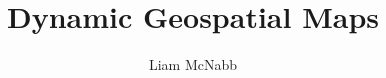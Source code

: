\documentclass[nobindpdf,a4paper,oneside]{hepthesis}
\title{Dynamic Geospatial Maps}
\author{Liam McNabb}
\begin{document}
\small
\begin{frontmatter}
  
\end{frontmatter}

\begin{mainmatter}
 
 
 
 
 
 
 
 
\end{mainmatter}
 
\begin{appendices}
	
  
\end{appendices}

\begin{backmatter}
  
\end{backmatter}

\end{document}
